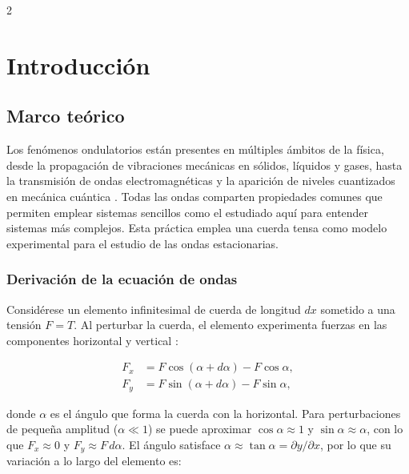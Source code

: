 \documentclass[12pt,a4paper]{article}
\begin{document}
\begin{multicols}{2}

\section{Introducción}

\subsection{Marco teórico}

Los fenómenos ondulatorios están presentes en múltiples ámbitos de la física, desde la propagación de vibraciones mecánicas en sólidos, líquidos y gases, hasta la transmisión de ondas electromagnéticas y la aparición de niveles cuantizados en mecánica cuántica \cite{french1971}. Todas las ondas comparten propiedades comunes que permiten emplear sistemas sencillos como el estudiado aquí para entender sistemas más complejos. Esta práctica emplea una cuerda tensa como modelo experimental para el estudio de las ondas estacionarias.

\subsubsection{Derivación de la ecuación de ondas}

Considérese un elemento infinitesimal de cuerda de longitud $dx$ sometido a una tensión $F = T$. Al perturbar la cuerda, el elemento experimenta fuerzas en las componentes horizontal y vertical \cite{taylor2005}:

\begin{align}
  F_x &= F\cos(\alpha+d\alpha) - F\cos\alpha, \label{eq:Fx}\\
  F_y &= F\sin(\alpha+d\alpha) - F\sin\alpha, \label{eq:Fy}
\end{align}

donde $\alpha$ es el ángulo que forma la cuerda con la horizontal. Para perturbaciones de pequeña amplitud ($\alpha \ll 1$) se puede aproximar $\cos\alpha \approx 1$ y $\sin\alpha \approx \alpha$, con lo que $F_x \approx 0$ y $F_y \approx F\,d\alpha$. El ángulo satisface $\alpha \approx \tan\alpha = \partial y/\partial x$, por lo que su variación a lo largo del elemento es:


\end{multicols}
\end{document}

